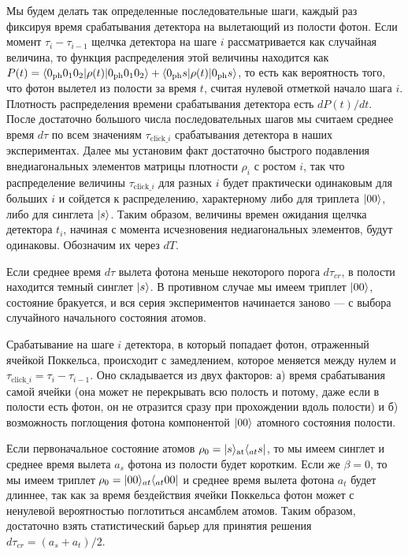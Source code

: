 Мы будем делать так определенные последовательные шаги, каждый раз фиксируя время срабатывания детектора на вылетающий из полости фотон. Если момент $\tau_i-\tau_{i-1}$ щелчка детектора на шаге $i$ рассматривается как случайная величина, то функция распределения этой величины находится как $P(t)=\langle 0_{\text{ph}}0_10_2|\rho(t)|0_{\text{ph}}0_10_2\rangle+\langle 0_{\text{ph}}s|\rho(t)|0_{\text{ph}}s\rangle$, то есть как вероятность того, что фотон вылетел из полости за время $t$, считая нулевой отметкой начало шага $i$. Плотность распределения времени срабатывания детектора есть $dP(t)/dt$. После достаточно большого числа последовательных шагов мы считаем среднее время $d\tau$ по всем значениям $\tau_{\text{click}\_i}$ срабатывания детектора в наших экспериментах. Далее мы установим факт достаточно быстрого подавления внедиагональных элементов матрицы плотности $\rho_i$ с ростом $i$, так что распределение величины $\tau_{\text{click}\_i}$ для разных $i$ будет практически одинаковым для больших $i$ и сойдется к распределению, характерному  либо для триплета $|00\rangle$,  либо для синглета $|s\rangle$. Таким образом, величины времен ожидания щелчка детектора $t_i$, начиная с момента исчезновения недиагональных элементов, будут одинаковы. Обозначим их через $dT$. 

Если среднее время $d\tau$ вылета фотона меньше некоторого порога $d\tau_{cr}$, в полости находится темный синглет $|s\rangle$. В противном случае мы имеем триплет $|00\rangle$, состояние бракуется, и вся серия экспериментов начинается заново --- с выбора случайного начального состояния атомов.

Срабатывание на шаге $i$ детектора, в который попадает фотон, отраженный ячейкой Поккельса, происходит с замедлением, которое меняется между нулем и $\tau_{\text{click}\_i}=\tau_{i}-\tau_{i-1}$. Оно складывается из двух факторов: а) время срабатывания самой ячейки (она может не перекрывать всю полость и потому, даже если в полости есть фотон, он не отразится сразу при прохождении вдоль полости) и б) возможность поглощения фотона компонентой $|00\rangle$ атомного состояния  полости.  

Если первоначальное состояние атомов $\rho_0=|s\rangle_{\text{at}}\langle_{at} s|$, то мы имеем синглет и среднее время вылета $a_s$ фотона из полости будет коротким. Если же $\beta=0$, то мы имеем триплет $\rho_0=|00\rangle_{at}\langle_{at} 00|$ и среднее время вылета фотона $a_t$ будет длиннее, так как за время бездействия ячейки Поккельса фотон может с ненулевой вероятностью поглотиться ансамблем атомов. Таким образом, достаточно взять статистический барьер для принятия решения $d\tau_{cr}=(a_s+a_t)/2$. 

